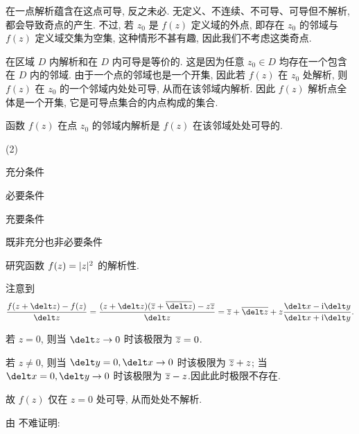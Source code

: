 
\alert{在一点解析蕴含在这点可导, 反之未必.} 
无定义、不连续、不可导、可导但不解析, 都会导致奇点的产生.
不过, 若 $z_0$ 是 $f(z)$ 定义域的外点, 即存在 $z_0$ 的邻域与 $f(z)$ 定义域交集为空集, 这种情形不甚有趣, 因此我们不考虑这类奇点.

\alert{在区域 $D$ 内解析和在 $D$ 内可导是等价的.} 
这是因为任意 $z_0\in D$ 均存在一个包含在 $D$ 内的邻域.
由于一个点的邻域也是一个开集, 因此若 $f(z)$ 在 $z_0$ 处解析, 则 $f(z)$ 在 $z_0$ 的一个邻域内处处可导, 从而在该邻域内解析. 因此 \alert{$f(z)$ 解析点全体是一个开集}, 它是可导点集合的内点构成的集合.

\begin{exercise}
  函数 $f(z)$ 在点 $z_0$ 的邻域内解析是 $f(z)$ 在该邻域处处可导的\fillbrace{}.
  \begin{examplechoice}(2)
    \item 充分条件
    \item 必要条件
    \item 充要条件
    \item 既非充分也非必要条件
  \end{examplechoice}
\end{exercise}

\begin{example}
  研究函数 $f(z)=\lvert z\rvert^2$ 的解析性.
\end{example}

\begin{solution}
  注意到
  \[
     \frac{f(z+\delt z)-f(z)}{\delt z}
    =\frac{(z+\delt z)(\ov z+\ov{\delt z})-z\ov z}{\delt z}
    =\ov z+\ov{\delt z}
      +z\frac{\delt x-\ii\delt y}{\delt x+\ii\delt y}.
  \]
  \vspace{-\baselineskip}
  \begin{enumr}
    \item 若 $z=0$, 则当 $\delt z\ra 0$ 时该极限为 $\overline z=0$.
    \item 若 $z\neq0$, 则当 $\delt y=0,\delt x\ra 0$ 时该极限为 $\overline z+z$; 当 $\delt x=0,\delt y\ra 0$ 时该极限为 $\overline z-z$.因此此时极限不存在.
  \end{enumr}
  故 $f(z)$ 仅在 $z=0$ 处可导, 从而处处不解析.
\end{solution}

由 不难证明:

